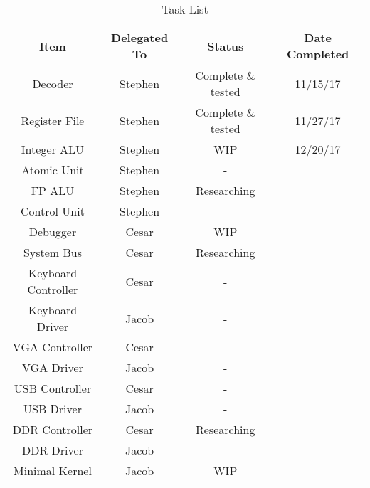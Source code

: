 \documentclass{article}
\begin{document}
\begin{table}[ht]
\centering
\caption{Task List}
\label{my-label}
\begin{tabular}{|c|c|c|c|}
\hline
\textbf{Item}       & \textbf{Delegated To} & \textbf{Status}    & \textbf{Date Completed} \\ \hline
Decoder             & Stephen               & Complete \& tested & 11/15/17                \\ \hline
Register File       & Stephen               & Complete \& tested & 11/27/17                \\ \hline
Integer ALU         & Stephen               & WIP                & 12/20/17                \\ \hline
Atomic Unit         & Stephen               & -                  &                         \\ \hline
FP ALU              & Stephen               & Researching        &                         \\ \hline
Control Unit        & Stephen               & -                  &                         \\ \hline
Debugger            & Cesar                 & WIP                &                         \\ \hline
System Bus          & Cesar                 & Researching        &                         \\ \hline
Keyboard Controller & Cesar                 & -                  &                         \\ \hline
Keyboard Driver     & Jacob                 & -                  &                         \\ \hline
VGA Controller      & Cesar                 & -                  &                         \\ \hline
VGA Driver          & Jacob                 & -                  &                         \\ \hline
USB Controller      & Cesar                 & -                  &                         \\ \hline
USB Driver          & Jacob                 & -                  &                         \\ \hline
DDR Controller      & Cesar                 & Researching        &                         \\ \hline
DDR Driver          & Jacob                 & -                  &                         \\ \hline
Minimal Kernel      & Jacob                 & WIP                &                         \\ \hline

\end{tabular}
\end{table}
\end{document}
